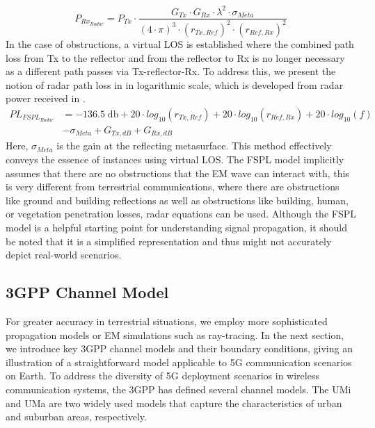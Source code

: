 \begin{equation} \label{FSPL_Linear_Radar}
	P_{Rx_{Radar}}= P_{Tx} \cdot \frac{G_{Tx} \cdot G_{Rx} \cdot \lambda^2 \cdot \sigma_{Meta}}{(4 \cdot \pi)^3 \cdot (r_{Tx, Ref})^2 \cdot (r_{Ref,Rx})^2}
\end{equation}
In the case of obstructions, a virtual LOS is established where the combined path loss from Tx to the reflector and from the reflector to Rx is no longer necessary as a different path passes via Tx-reflector-Rx. To address this, we present the notion of radar path loss in  in logarithmic scale, which is developed from radar power received in .
\begin{equation} \label{FSPL_dB_Radar}
	\begin{aligned}
		PL_{FSPL_{Radar}}&= -136.5 \; \si{\decibel}+ 20\cdot log_{10}(r_{Tx, Ref})+ 20\cdot log_{10}(r_{Ref, Rx})+ 20 \cdot log_{10}(f)\\
		& - \sigma_{Meta}  + G_{Tx, dB} + G_{Rx, dB}
	\end{aligned}
\end{equation}
Here, $\sigma_{Meta}$ is the gain at the reflecting metasurface. This method effectively conveys the essence of instances using virtual LOS. The FSPL model implicitly assumes that there are no obstructions that the EM wave can interact with, this is very different from terrestrial communications, where there are obstructions like ground and building reflections as well as obstructions like building, human, or vegetation penetration losses, radar equations can be used. Although the FSPL model is a helpful starting point for understanding signal propagation, it should be noted that it is a simplified representation and thus might not accurately depict real-world scenarios. 
\subsection{3GPP Channel Model} \label{3GPP channel model}
For greater accuracy in terrestrial situations, we employ more sophisticated propagation models or EM simulations such as ray-tracing. In the next section, we introduce key \ac{3GPP} channel models and their boundary conditions, giving an illustration of a straightforward model applicable to 5G communication scenarios on Earth. To address the diversity of 5G deployment scenarios in wireless communication systems, the \ac{3GPP} has defined several channel models. The \ac{UMi} and \ac{UMa} are two widely used models that capture the characteristics of urban and suburban areas, respectively.
